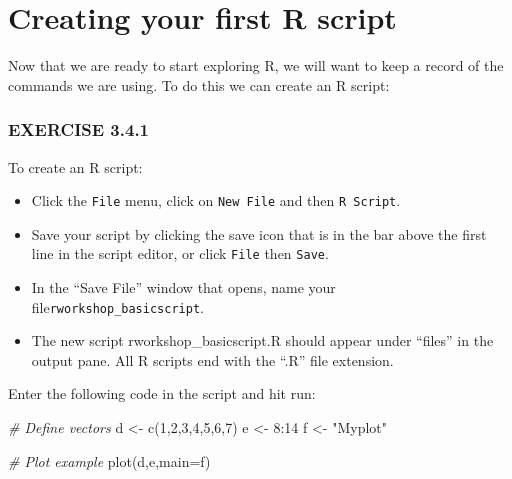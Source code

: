 \documentclass[
]{book}
\newenvironment{Shaded}{\begin{snugshade}}{\end{snugshade}}
\newcommand{\AttributeTok}[1]{\textcolor[rgb]{0.77,0.63,0.00}{#1}}
\newcommand{\CommentTok}[1]{\textcolor[rgb]{0.56,0.35,0.01}{\textit{#1}}}
\newcommand{\DecValTok}[1]{\textcolor[rgb]{0.00,0.00,0.81}{#1}}
\newcommand{\FunctionTok}[1]{\textcolor[rgb]{0.00,0.00,0.00}{#1}}
\newcommand{\NormalTok}[1]{#1}
\newcommand{\OtherTok}[1]{\textcolor[rgb]{0.56,0.35,0.01}{#1}}
\newcommand{\SpecialCharTok}[1]{\textcolor[rgb]{0.00,0.00,0.00}{#1}}
\newcommand{\StringTok}[1]{\textcolor[rgb]{0.31,0.60,0.02}{#1}}
\providecommand{\tightlist}{%
  \setlength{\itemsep}{0pt}\setlength{\parskip}{0pt}}
\begin{document}
\hypertarget{creating-your-first-r-script}{%
\section{Creating your first R script}\label{creating-your-first-r-script}}

Now that we are ready to start exploring R, we will want to keep a record of the commands we are using. To do this we can create an R script:

\hypertarget{exercise-3.4.1}{%
\subsubsection*{EXERCISE 3.4.1}\label{exercise-3.4.1}}

To create an R script:

\begin{itemize}
\tightlist
\item
  Click the \texttt{File} menu, click on \texttt{New\ File} and then \texttt{R\ Script}.
\item
  Save your script by clicking the save icon that is in the bar above the first line in the script editor, or click \texttt{File} then \texttt{Save}.
\item
  In the ``Save File'' window that opens, name your file\texttt{rworkshop\_basicscript}.
\item
  The new script rworkshop\_basicscript.R should appear under ``files'' in the output pane. All R scripts end with the ``.R'' file extension.
\end{itemize}

Enter the following code in the script and hit run:

\begin{Shaded}
\begin{Highlighting}[]
\CommentTok{\# Define vectors}
\NormalTok{d }\OtherTok{\textless{}{-}} \FunctionTok{c}\NormalTok{(}\DecValTok{1}\NormalTok{,}\DecValTok{2}\NormalTok{,}\DecValTok{3}\NormalTok{,}\DecValTok{4}\NormalTok{,}\DecValTok{5}\NormalTok{,}\DecValTok{6}\NormalTok{,}\DecValTok{7}\NormalTok{)}
\NormalTok{e }\OtherTok{\textless{}{-}} \DecValTok{8}\SpecialCharTok{:}\DecValTok{14}
\NormalTok{f }\OtherTok{\textless{}{-}} \StringTok{"Myplot"}

\CommentTok{\# Plot example}
\FunctionTok{plot}\NormalTok{(d,e,}\AttributeTok{main=}\NormalTok{f)}
\end{Highlighting}
\end{Shaded}
\end{document}
